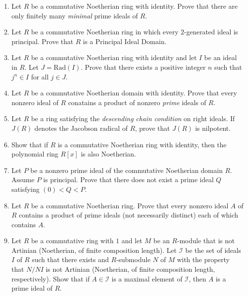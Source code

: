 \documentclass{article}
\theoremstyle{definition}
\begin{document}
\begin{enumerate}
            \item Let $R$ be a commutative Noetherian ring with identity. Prove that there are only finitely many \textit{minimal} prime ideals of $R$.

            \item Let $R$ be a commutative Noetherian ring in which every $2$-generated ideal is principal. Prove that $R$ is a Principal Ideal Domain.
            
            \item Let $R$ be a commutative Noetherian ring with identity and let $I$ be an ideal in $R$. Let $J=\text{Rad}(I)$. Prove that there exists a positive integer $n$ such that $j^n\in I$ for all $j\in J$.
            
            \item Let $R$ be a commutative Noetherian domain with identity. Prove that every nonzero ideal of $R$ conatains a product of nonzero \textit{prime} ideals of $R$.
            
            \item Let $R$ be a ring satisfying the \textit{descending chain condition} on right ideals. If $J(R)$ denotes the Jacobson radical of $R$, prove that $J(R)$ is nilpotent.
            
            \item Show that if $R$ is a commutative Noetherian ring with identity, then the polynomial ring $R[x]$ is also Noetherian.
            
            \item Let $P$ be a nonzero prime ideal of the commutative Noetherian domain $R$. Assume $P$ is principal. Prove that there does not exist a prime ideal $Q$ satisfying $(0)<Q<P$.
            
            \item Let $R$ be a commutative Noetherian ring. Prove that every nonzero ideal $A$ of $R$ contains a product of prime ideals (not necessarily distinct) each of which contains $A$.
            
            \item Let $R$ be a commutative ring with $1$ and let $M$ be an $R$-module that is not Artinian (Noetherian, of finite composition length). Let $\mathcal{I}$ be the set of ideals $I$ of $R$ such that there exists and $R$-submodule $N$ of $M$ with the property that $N/NI$ is not Artinian (Noetherian, of finite composition length, respectively). Show that if $A\in \mathcal{I}$ is a maximal element of $\mathcal{I}$, then $A$ is a prime ideal of $R$.
            
            

    
\end{enumerate}
\end{document}
